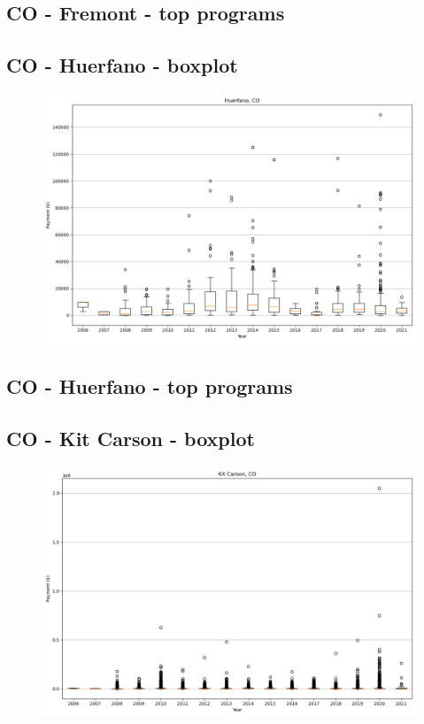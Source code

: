 \subsection*{CO - Fremont - top programs}

\newpage
\subsection*{CO - Huerfano - boxplot}
\begin{figure}[h]
\centering
\includegraphics[width=7in]{../output/boxplots/counties/Huerfano-CO_boxplot.png}
\end{figure}


\subsection*{CO - Huerfano - top programs}

\newpage
\subsection*{CO - Kit Carson - boxplot}
\begin{figure}[h]
\centering
\includegraphics[width=7in]{../output/boxplots/counties/Kit Carson-CO_boxplot.png}
\end{figure}


